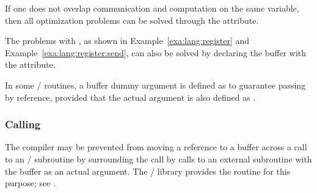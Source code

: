 If one does not overlap communication and computation on the same
variable, then all optimization problems can be solved
through the  attribute.

The problems with , as shown in
Example~\ref{exa:lang:register} and Example~\ref{exa:lang:register:send},
can also be solved by declaring the buffer  with the
 attribute.

In some \MPI/ routines, a buffer dummy argument is defined as  to
guarantee passing by reference, provided that the actual argument is also defined as
.

\subsubsection{Calling \texorpdfstring{}{MPI\_F\_SYNC\_REG}}
\label{sec:f90-problems:code-movements:f-sync-reg}

The compiler may be prevented from moving a reference to a buffer
across a call to an \MPI/ subroutine by surrounding the call by calls to
an external subroutine with the buffer as an actual argument.
The \MPI/ library provides the  routine for this purpose;
see .

